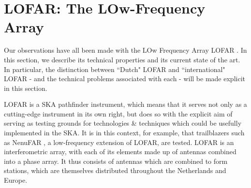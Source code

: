 \section{LOFAR: The LOw-Frequency Array}

\pg
Our observations have all been made with the LOw Frequency Array LOFAR . In this section, we describe its technical properties and its current state of the art. In particular, the distinction between ``Dutch" LOFAR and ``international" LOFAR - and the technical problems associated with each - will be made explicit in this section.

\pg
LOFAR is a SKA pathfinder instrument, which means that it serves not only as a cutting-edge instrument in its own right, but does so with the explicit aim of serving as testing grounds for technologies \& techniques which could be usefully implemented in the SKA. It is in this context, for example, that trailblazers such as NenuFAR , a low-frequency extension of LOFAR, are tested. LOFAR is an interferometric array, with each of its elements made up of antennas combined into a phase array. It thus consists of antennas which are combined to form stations, which are themselves distributed throughout the Netherlands and Europe.
